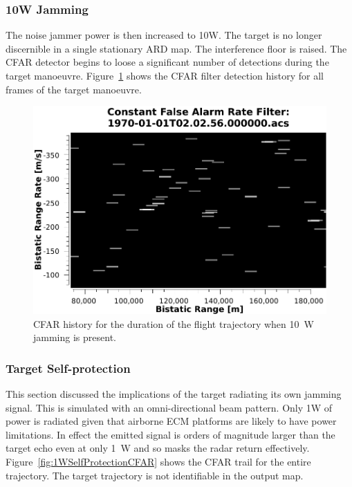 \documentclass[conference]{IEEEtran}
\begin{document}
\subsubsection{10W Jamming}\label{sec:Jam10W}

The noise jammer power is then increased to 10W. The target is no longer discernible in a single stationary ARD map. The interference floor is raised. The CFAR detector begins to loose a significant number of detections during the target manoeuvre. Figure~\ref{fig:10WJammingCFAR} shows the CFAR filter detection history for all frames of the target manoeuvre.


\begin{figure}[htbp]
\begin{center}
\includegraphics[width=1.0\columnwidth]{figs/Simulations/10WJammingCFAR.pdf}
\caption{CFAR history for the duration of the flight trajectory when 10~W jamming is present.}
\label{fig:10WJammingCFAR}
\end{center}
\end{figure}


\subsubsection{Target Self-protection}\label{sec:SelfProtection}

This section discussed the implications of the target radiating its own jamming signal. This is simulated with an omni-directional beam pattern. Only 1W of power is radiated given that airborne ECM platforms are likely to have power limitations. In effect the emitted signal is orders of magnitude larger than the target echo even at only 1~W and so masks the radar return effectively. Figure~\ref{fig:1WSelfProtectionCFAR} shows the CFAR trail for the entire trajectory. The target trajectory is not identifiable in the output map.
\end{document}

